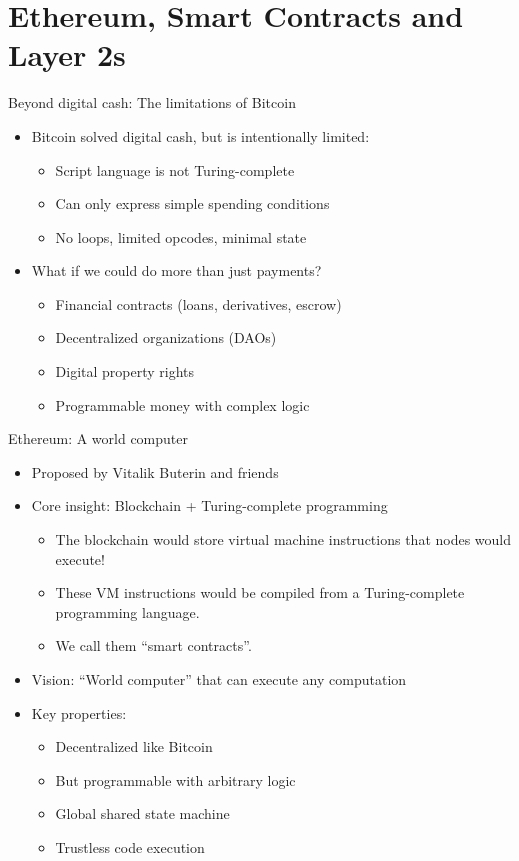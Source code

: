 \documentclass[aspectratio=169, lualatex, handout]{beamer}
\begin{document}
\section{Ethereum, Smart Contracts and Layer 2s}

\begin{frame}{Beyond digital cash: The limitations of Bitcoin}
	\begin{itemize}
		\item Bitcoin solved digital cash, but is intentionally limited:
		      \begin{itemize}
			      \item Script language is not Turing-complete
			      \item Can only express simple spending conditions
			      \item No loops, limited opcodes, minimal state
		      \end{itemize}
		\item What if we could do more than just payments?
		      \begin{itemize}
			      \item Financial contracts (loans, derivatives, escrow)
			      \item Decentralized organizations (DAOs)
			      \item Digital property rights
			      \item Programmable money with complex logic
		      \end{itemize}
	\end{itemize}
\end{frame}

\begin{frame}{Ethereum: A world computer}
	\begin{itemize}
		\item Proposed by Vitalik Buterin and friends
		\item Core insight: Blockchain + Turing-complete programming
		      \begin{itemize}
			      \item The blockchain would store virtual machine instructions that nodes would execute!
			      \item These VM instructions would be compiled from a Turing-complete programming language.
			      \item We call them ``smart contracts''.
		      \end{itemize}
		\item Vision: ``World computer'' that can execute any computation
		\item Key properties:
		      \begin{itemize}
			      \item Decentralized like Bitcoin
			      \item But programmable with arbitrary logic
			      \item Global shared state machine
			      \item Trustless code execution
		      \end{itemize}
	\end{itemize}
\end{frame}
\end{document}

